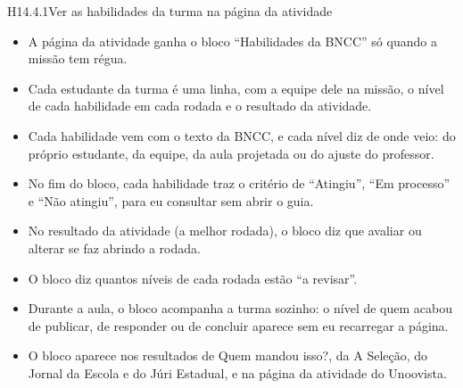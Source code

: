 \begin{historia}{H14.4.1}{Ver as habilidades da turma na página da atividade}{\pronto}
\aceite
\begin{itemize}
  \item A página da atividade ganha o bloco \enquote{Habilidades da BNCC} só
    quando a missão tem régua.
  \item Cada estudante da turma é uma linha, com a equipe dele na missão, o
    nível de cada habilidade em cada rodada e o resultado da atividade.
  \item Cada habilidade vem com o texto da BNCC, e cada nível diz de onde veio:
    do próprio estudante, da equipe, da aula projetada ou do ajuste do
    professor.
  \item No fim do bloco, cada habilidade traz o critério de \enquote{Atingiu},
    \enquote{Em processo} e \enquote{Não atingiu}, para eu consultar sem
    abrir o guia.
  \item No resultado da atividade (a melhor rodada), o bloco diz que avaliar ou
    alterar se faz abrindo a rodada.
  \item O bloco diz quantos níveis de cada rodada estão \enquote{a revisar}.
  \item Durante a aula, o bloco acompanha a turma sozinho: o nível de quem
    acabou de publicar, de responder ou de concluir aparece sem eu recarregar a
    página.
  \item O bloco aparece nos resultados de Quem mandou isso?, da A Seleção, do
    Jornal da Escola e do Júri Estadual, e na página da atividade do
    Unoovista.
\end{itemize}
\end{historia}


